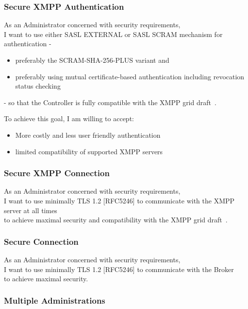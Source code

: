 \subsubsection{Secure XMPP Authentication}

As an Administrator concerned with security requirements,\\
I want to use either SASL EXTERNAL or SASL SCRAM mechanism for authentication -

\begin{itemize}
    \item preferably the SCRAM-SHA-256-PLUS variant and
    \item preferably using mutual certificate-based authentication including revocation status checking
\end{itemize}

\noindent - so that the Controller is fully compatible with the XMPP grid draft~\cite{ietf-mile-xmpp-grid-05}.

\noindent To achieve this goal, I am willing to accept:
\begin{itemize}
    \item More costly and less user friendly authentication
    \item limited compatibility of supported XMPP servers
\end{itemize}

\subsubsection{Secure XMPP Connection}

As an Administrator concerned with security requirements,\\
I want to use minimally TLS 1.2 [RFC5246] to communicate with the XMPP server at all times\\
to achieve maximal security and compatibility with the XMPP grid draft~\cite{ietf-mile-xmpp-grid-05}.

\subsubsection{Secure Connection}

As an Administrator concerned with security requirements,\\
I want to use minimally TLS 1.2 [RFC5246] to communicate with the Broker\\
to achieve maximal security.

\subsubsection{Multiple Administrations}

